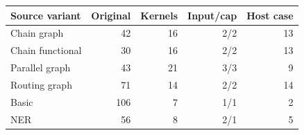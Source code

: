 \begin{tabular}{lrrrr}
\hline
Source variant & Original & Kernels & Input/cap & Host case \\
\hline
Chain graph & 42 & 16 & 2/2 & 13 \\
Chain functional & 30 & 16 & 2/2 & 13 \\
Parallel graph & 43 & 21 & 3/3 & 9 \\
Routing graph & 71 & 14 & 2/2 & 14 \\
Basic & 106 & 7 & 1/1 & 2 \\
NER & 56 & 8 & 2/1 & 5 \\
\hline
\end{tabular}
